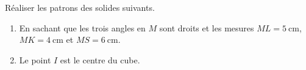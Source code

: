 
\begin{exercice}\label{exo2smath-0184}

    Réaliser les patrons des solides suivants.
            

    \begin{enumerate}

    \item
    En sachant que les trois angles en \( M\) sont droits et les mesures \( ML=\SI{5}{\centi\meter}\), \( MK=\SI{4}{\centi\meter}\) et \( MS=\SI{6}{\centi\meter}\). 

\item\label{ItemTDFMooPuUJaDii}

    Le point \( I\) est le centre du cube.
    \end{enumerate}

      
   \hspace{-1cm}
   


\end{exercice}
